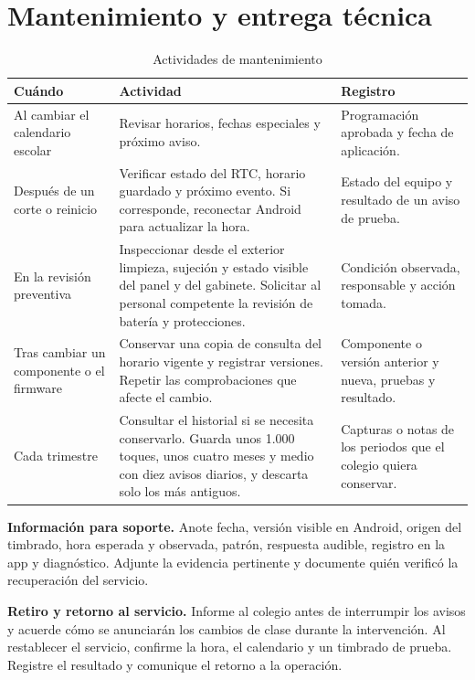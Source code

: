 \documentclass[a4paper,11pt]{article}
\begin{document}
\section{Mantenimiento y entrega técnica}
\label{sec:mantenimiento}
\begin{table}[H]
\centering\small
\caption{Actividades de mantenimiento}
\begin{tabularx}{\linewidth}{@{}P{3.45cm}YY@{}}
\toprule
\textbf{Cuándo} & \textbf{Actividad} & \textbf{Registro} \\
\midrule
Al cambiar el calendario escolar & Revisar horarios, fechas especiales y próximo aviso. & Programación aprobada y fecha de aplicación. \\
Después de un corte o reinicio & Verificar estado del RTC, horario guardado y próximo evento. Si corresponde, reconectar Android para actualizar la hora. & Estado del equipo y resultado de un aviso de prueba. \\
En la revisión preventiva & Inspeccionar desde el exterior limpieza, sujeción y estado visible del panel y del gabinete. Solicitar al personal competente la revisión de batería y protecciones. & Condición observada, responsable y acción tomada. \\
Tras cambiar un componente o el firmware & Conservar una copia de consulta del horario vigente y registrar versiones. Repetir las comprobaciones que afecte el cambio. & Componente o versión anterior y nueva, pruebas y resultado. \\
Cada trimestre & Consultar el historial si se necesita conservarlo. Guarda unos 1.000 toques, unos cuatro meses y medio con diez avisos diarios, y descarta solo los más antiguos. & Capturas o notas de los periodos que el colegio quiera conservar. \\
\bottomrule
\end{tabularx}
\end{table}

\textbf{Información para soporte.} Anote fecha, versión visible en Android, origen del timbrado, hora esperada y observada, patrón, respuesta audible, registro en la app y diagnóstico. Adjunte la evidencia pertinente y documente quién verificó la recuperación del servicio.

\textbf{Retiro y retorno al servicio.} Informe al colegio antes de interrumpir los avisos y acuerde cómo se anunciarán los cambios de clase durante la intervención. Al restablecer el servicio, confirme la hora, el calendario y un timbrado de prueba. Registre el resultado y comunique el retorno a la operación.
\end{document}
